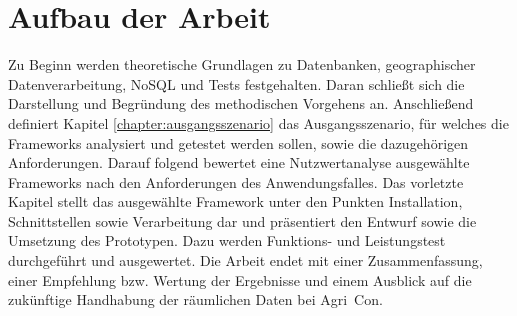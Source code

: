 \section{Aufbau der Arbeit}


Zu Beginn werden theoretische Grundlagen zu Datenbanken, geographischer Datenverarbeitung, NoSQL und Tests festgehalten.
Daran schließt sich die Darstellung und Begründung des methodischen Vorgehens an.
Anschließend definiert Kapitel \ref{chapter:ausgangsszenario} das Ausgangsszenario, für welches die Frameworks analysiert und getestet werden sollen, sowie die dazugehörigen Anforderungen.
Darauf folgend bewertet eine Nutzwertanalyse ausgewählte Frameworks nach den Anforderungen des Anwendungsfalles.
Das vorletzte Kapitel stellt das ausgewählte Framework unter den Punkten Installation, Schnittstellen sowie Verarbeitung dar und präsentiert den Entwurf sowie die Umsetzung des Prototypen.
Dazu werden Funktions- und Leistungstest durchgeführt und ausgewertet.
Die Arbeit endet mit einer Zusammenfassung, einer Empfehlung bzw. Wertung der Ergebnisse und einem Ausblick auf die zukünftige Handhabung der räumlichen Daten bei Agri~Con.